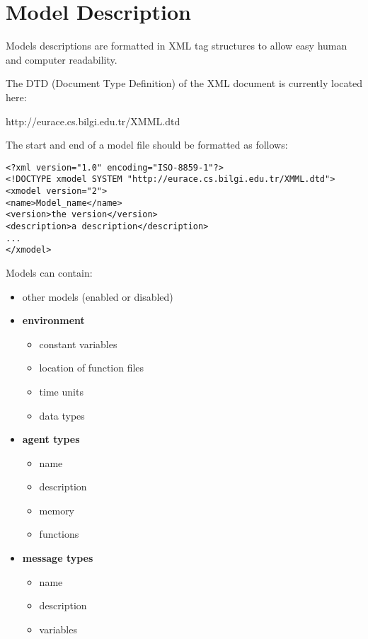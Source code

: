 \section{Model Description}
\label{model_description}

Models descriptions are formatted in XML tag structures to allow
easy human and computer readability.

The DTD (Document Type Definition) of the XML document is currently located
here:

http://eurace.cs.bilgi.edu.tr/XMML.dtd

The start and end of a model file should be formatted as follows:

\begin{mylisting}
\begin{verbatim}
<?xml version="1.0" encoding="ISO-8859-1"?>
<!DOCTYPE xmodel SYSTEM "http://eurace.cs.bilgi.edu.tr/XMML.dtd">
<xmodel version="2">
<name>Model_name</name>
<version>the version</version>
<description>a description</description>
...
</xmodel>
\end{verbatim}
\end{mylisting}

Models can contain:
\begin{itemize}
\item other models (enabled or disabled)
\item \textbf{environment}
\begin{itemize}
\item constant variables
\item location of function files
\item time units
\item data types
\end{itemize}
\item \textbf{agent types}
\begin{itemize}
\item name
\item description
\item memory
\item functions
\end{itemize}
\item \textbf{message types}
\begin{itemize}
\item name
\item description
\item variables
\end{itemize}
\end{itemize}

